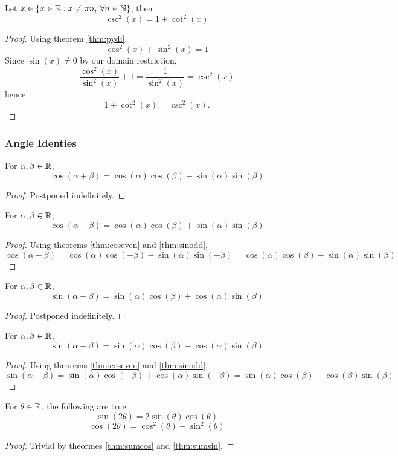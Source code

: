 \begin{cor}
	Let $x\in \left\{x\in\mathbb{R}: x\neq \pi n, \:
\forall n\in\mathbb{N}\right\}$, then
$$\csc^2(x)=1+\cot^2(x)$$
\end{cor}
\begin{proof}
	Using theorem \eqref{thm:pydi},
	$$\cos^2(x)+\sin^2(x)=1$$
	Since $\sin(x)\neq0$ by our domain restriction,
	$$\frac{\cos^2(x)}{\sin^2(x)}+1=\frac{1}{\sin^2(x)}=\csc^2(x)$$
	hence
	$$1+\cot^2(x)=\csc^2(x).$$
\end{proof}

\subsubsection{Angle Identies}
\begin{theorem}
\label{thm:sumcos}
For $\alpha,\beta\in\mathbb{R}$,
$$\cos(\alpha+\beta)=\cos(\alpha)\cos(\beta)-\sin(\alpha)\sin(\beta)$$
\end{theorem}
\begin{proof}
	Postponed indefinitely.
\end{proof}
\begin{cor}
	For $\alpha,\beta\in\mathbb{R}$,
$$\cos(\alpha-\beta)=\cos(\alpha)\cos(\beta)+\sin(\alpha)\sin(\beta)$$
\end{cor}
\begin{proof}
	Using theorems \eqref{thm:coseven} and \eqref{thm:sinodd},
	$$\cos(\alpha-\beta)=
	\cos(\alpha)\cos(-\beta)-\sin(\alpha)\sin(-\beta)=
	\cos(\alpha)\cos(\beta)+\sin(\alpha)\sin(\beta)$$
\end{proof}

\begin{theorem}
\label{thm:sumsin}
For $\alpha,\beta\in\mathbb{R}$,
$$\sin(\alpha+\beta)=\sin(\alpha)\cos(\beta)+\cos(\alpha)\sin(\beta)$$
\end{theorem}
\begin{proof}
	Postponed indefinitely.
\end{proof}

\begin{cor}
	For $\alpha,\beta\in\mathbb{R}$,
$$\sin(\alpha-\beta)=\sin(\alpha)\cos(\beta)-\cos(\alpha)\sin(\beta)$$
\end{cor}
\begin{proof}
	Using theorems \eqref{thm:coseven} and \eqref{thm:sinodd},
	$$\sin(\alpha-\beta)=\sin(\alpha)\cos(-\beta)+\cos(\alpha)\sin(-\beta)
	=\sin(\alpha)\cos(\beta)-\cos(\beta)\sin(\beta)$$
\end{proof}

\begin{cor}
	For $\theta\in\mathbb{R}$, the following are true:
	$$\sin(2\theta)=2\sin(\theta)\cos(\theta)$$
	$$\cos(2\theta)=\cos^2(\theta)-\sin^2(\theta)$$
	\label{cor:doubleangle}
\end{cor}
\begin{proof}
	Trivial by theormes \eqref{thm:sumcos} and \eqref{thm:sumsin}.
\end{proof}

